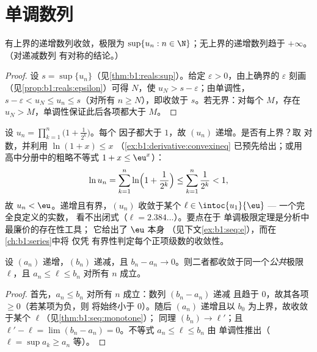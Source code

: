 \section{单调数列}

\begin{theorem}[单调极限定理]\label{thm:b1:seq:monotone}
有上界的递增数列收敛，极限为 $\sup\{u_n : n \in
\N\}$；无上界的递增数列趋于
$+\infty$。（对递减数列
有对称的结论。）
\end{theorem}

\begin{proof}
设 $s = \sup\{u_n\}$（见\cref{thm:b1:reals:sup}）。给定 $\varepsilon >
0$，由上确界的 $\varepsilon$ 刻画
（见\cref{prop:b1:reals:epsilon}）可得 $N$，使 $u_N > s -
\varepsilon$；由单调性，$s - \varepsilon < u_N \leq u_n \leq
s$（对所有 $n \geq N$），即收敛于 $s$。若无界：对每个
$M$，存在 $u_N > M$，单调性保证此后各项都大于 $M$。
\end{proof}

\begin{example}[作为存在性工具的单调定理]\label{ex:b1:seq:existencemachine}
设 $u_n = \prod_{k=1}^{n} \bigl(1 + \frac{1}{2^k}\bigr)$。每个
因子都大于 $1$，故 $(u_n)$ 递增。是否有上界？取
对数，并利用 $\ln(1 + x) \leq x$
（\cref{ex:b1:derivative:convexineq} 已预先给出；或用
高中分册中的粗略不等式 $1 + x \leq \eu^x$）：
\[
\ln u_n = \sum_{k=1}^{n} \ln\Bigl(1 + \frac{1}{2^k}\Bigr)
\leq \sum_{k=1}^{n} \frac{1}{2^k} < 1 ,
\]
故 $u_n < \eu$。递增且有界，$(u_n)$ 收敛于某个
$\ell \in \intoc{u_1}{\eu}$ --- 一个完全良定义的实数，
看不出闭式（$\ell = 2.384\dots$）。要点在于
单调极限定理是分析中最廉价的存在性工具；
它给出了 $\eu$ 本身
（见下文\cref{ex:b1:seq:e}），而在\cref{ch:b1:series}中将
仅凭
有界性判定每个正项级数的收敛性。
\end{example}

\begin{theorem}[相邻数列]\label{thm:b1:seq:adjacent}
设 $(a_n)$ 递增，$(b_n)$ 递减，且 $b_n - a_n \to
0$。则二者都收敛于同一个\emph{公共}极限 $\ell$，且 $a_n
\leq \ell \leq b_n$ 对所有 $n$ 成立。
\end{theorem}

\begin{proof}
首先，$a_n \leq b_n$ 对所有 $n$ 成立：数列 $(b_n - a_n)$ 递减
且趋于 $0$，故其各项 $\geq 0$（若某项为负，则
将始终小于 $0$）。随后 $(a_n)$ 递增且以
$b_0$ 为上界，故收敛于某个 $\ell$（见\cref{thm:b1:seq:monotone}）；
同理 $(b_n) \to \ell'$；且 $\ell' - \ell = \lim (b_n - a_n) =
0$。不等式 $a_n \leq \ell \leq b_n$ 由
单调性推出（$\ell = \sup a_k \geq a_n$ 等）。
\end{proof}

